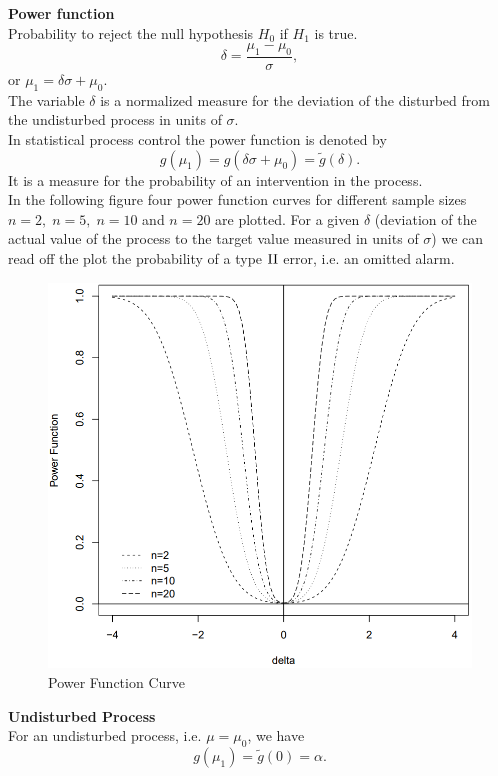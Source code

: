 \textbf{Power function}\\
Probability to reject the null hypothesis $H_0$ if $H_1$ is true.\\
\begin{equation}
  \delta = \frac{\mu_1 - \mu_0}{\sigma},
\end{equation}
or $\mu_1 = \delta\sigma + \mu_0$.\\
The variable $\delta$ is a normalized measure for the deviation of the disturbed from the undisturbed process in units of $\sigma$.\\
In statistical process control the power function is denoted by
\begin{equation}
  g(\mu_1) = g(\delta\sigma + \mu_0) = \tilde{g} (\delta).
\end{equation}
It is a measure for the probability of an intervention in the process.\\

In the following figure four power function curves for different sample sizes $n=2,\; n=5,\; n=10$ and $n=20$ are plotted.
For a given $\delta$ (deviation of the actual value of the process to the target value measured in units of $\sigma$) we can read off the plot the probability of a type $\textup{II}$ error, i.e. an omitted alarm.
\begin{figure}[H]
  \centering
  \includegraphics[width=0.8\linewidth]{Pics/3.3.2.png}
  \caption{Power Function Curve}
\end{figure}

\textbf{Undisturbed Process}\\
For an undisturbed process, i.e. $\mu = \mu_0$, we have
\begin{equation}
  g(\mu_1) = \tilde{g} (0) = \alpha.
  \label{eq:3.3.a}
\end{equation}

